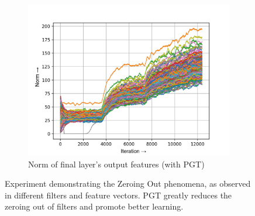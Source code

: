 \documentclass[times,sort&compress]{elsarticle}
\begin{document}
\begin{figure}[t]
\begin{subfigure}[t]{0.32\textwidth}
\includegraphics[width=\linewidth]{pgt-f-layer-22-1}
\caption{Norm of final layer's output features (with PGT)}
\end{subfigure}
\captionsetup{font=normalsize}
\caption{ Experiment demonstrating the Zeroing Out phenomena, as observed in different
filters and feature vectors. PGT greatly reduces the zeroing out of filters and promote
better learning. }
\label{fig:norm_plots}
\end{figure}
\end{document}
